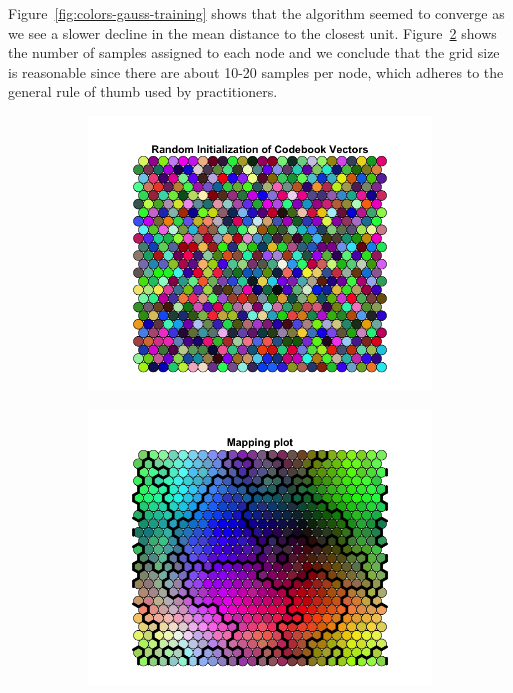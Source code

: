 \begin{figure}[t]
\begin{subfigure}[b]{0.4\textwidth}
        \caption{}
        \label{fig:colors-gauss-nodesize}
    \end{subfigure}
\end{figure}

Figure~\ref{fig:colors-gauss-training} shows that the algorithm 
seemed to converge as we see a slower decline in the mean distance to the closest unit.
Figure~\ref{fig:colors-gauss-nodesize} shows the number of samples assigned to each node
and we conclude that the grid size is reasonable since there are about 10-20
samples per node, which adheres to the general rule of thumb used by practitioners.

\begin{figure}[t]
    \centering
    \begin{subfigure}[b]{0.4\textwidth}
        \centering
        \includegraphics[width=\textwidth]{../figs/Colors-Bubble-5.png}
        \caption{}
        \label{sfig:color-random}
    \end{subfigure}
    \begin{subfigure}[b]{0.4\textwidth}
        \centering
        \includegraphics[width=\textwidth]{../figs/Colors-Gaussian-6.png}

\end{subfigure}
\end{figure}
